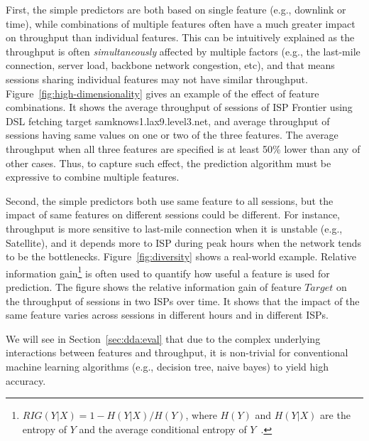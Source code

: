 
First, the simple predictors are both based on single feature (e.g., downlink or time), while combinations of multiple features often have a much greater impact on throughput than individual features. This can be intuitively explained as the throughput is often {\em simultaneously} affected by multiple factors (e.g., the last-mile connection, server load, backbone network congestion, etc), and that means sessions sharing individual features may not have similar throughput. Figure~\ref{fig:high-dimensionality} gives an example of the effect of feature combinations. It shows the average throughput of sessions of ISP Frontier using DSL fetching target samknows1.lax9.level3.net, and average throughput of sessions having same values on one or two of the three features. The average throughput when all three features are specified is at least 50\% lower than any of other cases. Thus, to capture such effect, the prediction algorithm must be expressive to combine multiple features. %

Second, the simple predictors both use same feature to all sessions, but the impact of same features on different sessions could be different. For instance, throughput is more sensitive to last-mile connection when it is unstable (e.g., Satellite), and it depends more to ISP during peak hours when the network tends to be the bottlenecks. Figure~\ref{fig:diversity} shows a real-world example. Relative information gain\footnote{$RIG(Y|X) = 1-H(Y|X)/H(Y)$, where $H(Y)$ and $H(Y|X)$ are the entropy of $Y$ and the average conditional
entropy of $Y$~\cite{informationgain}.} is often used to quantify how useful a feature is used for prediction. The figure shows the relative information gain of feature $\mathit{Target}$ on the throughput of sessions in two ISPs over time.
It shows that the impact of the same feature varies across sessions in different hours and in different ISPs. %

We will see in Section~\ref{sec:dda:eval} that due to the complex underlying interactions between features and throughput, it is non-trivial for conventional machine learning algorithms (e.g., decision tree, naive bayes) to yield high accuracy.






